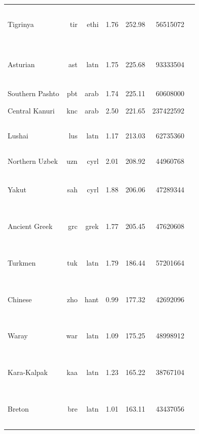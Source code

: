 \documentclass[11pt]{article}
\begin{document}
\begin{center}
\begin{longtable}[width=0.9\textwidth]{|lrrrrrl|}
Tigrinya & tir & ethi & 1.76 & 252.98 & 56515072 & {\color{nllb}\rule{0.84cm}{8pt}}{\color{madlad400}\rule{0.54cm}{8pt}}{\color{glot500}\rule{0.4cm}{8pt}}{\color{other}\rule{2.22cm}{8pt}} \\ 
Asturian & ast & latn & 1.75 & 225.68 & 93333504 & {\color{oscar}\rule{0.01cm}{8pt}}{\color{nllb}\rule{0.99cm}{8pt}}{\color{glot500}\rule{2.07cm}{8pt}}{\color{other}\rule{0.9300000000000002cm}{8pt}} \\ 
Southern Pashto & pbt & arab & 1.74 & 225.11 & 60608000 & {\color{nllb}\rule{4.0cm}{8pt}} \\ 
Central Kanuri & knc & arab & 2.50 & 221.65 & 237422592 & {\color{nllb}\rule{4.0cm}{8pt}} \\ 
Lushai & lus & latn & 1.17 & 213.03 & 62735360 & {\color{nllb}\rule{1.6cm}{8pt}}{\color{madlad400}\rule{2.17cm}{8pt}}{\color{glot500}\rule{0.22999999999999998cm}{8pt}} \\ 
Northern Uzbek & uzn & cyrl & 2.01 & 208.92 & 44960768 & {\color{glot500}\rule{4.0cm}{8pt}} \\ 
Yakut & sah & cyrl & 1.88 & 206.06 & 47289344 & {\color{oscar}\rule{0.17cm}{8pt}}{\color{madlad400}\rule{1.56cm}{8pt}}{\color{glot500}\rule{1.26cm}{8pt}}{\color{other}\rule{1.0099999999999998cm}{8pt}} \\ 
Ancient Greek & grc & grek & 1.77 & 205.45 & 47620608 & {\color{madlad400}\rule{3.89cm}{8pt}}{\color{glot500}\rule{0.01cm}{8pt}}{\color{other}\rule{0.10000000000000009cm}{8pt}} \\ 
Turkmen & tuk & latn & 1.79 & 186.44 & 57201664 & {\color{oscar}\rule{0.17cm}{8pt}}{\color{nllb}\rule{0.0cm}{8pt}}{\color{madlad400}\rule{3.32cm}{8pt}}{\color{glot500}\rule{0.41cm}{8pt}}{\color{other}\rule{0.10000000000000009cm}{8pt}} \\ 
Chinese & zho & hant & 0.99 & 177.32 & 42692096 & {\color{nllb}\rule{1.46cm}{8pt}}{\color{glot500}\rule{1.2cm}{8pt}}{\color{other}\rule{1.3399999999999999cm}{8pt}} \\ 
Waray & war & latn & 1.09 & 175.25 & 48998912 & {\color{oscar}\rule{0.05cm}{8pt}}{\color{nllb}\rule{1.03cm}{8pt}}{\color{madlad400}\rule{0.17cm}{8pt}}{\color{other}\rule{2.75cm}{8pt}} \\ 
Kara-Kalpak & kaa & latn & 1.23 & 165.22 & 38767104 & {\color{madlad400}\rule{3.9cm}{8pt}}{\color{glot500}\rule{0.03cm}{8pt}}{\color{other}\rule{0.07000000000000028cm}{8pt}} \\ 
Breton & bre & latn & 1.01 & 163.11 & 43437056 & {\color{oscar}\rule{0.29cm}{8pt}}{\color{madlad400}\rule{1.62cm}{8pt}}{\color{glot500}\rule{1.32cm}{8pt}}{\color{other}\rule{0.7699999999999996cm}{8pt}} \\ 

\end{longtable}
\end{center}
\end{document}
